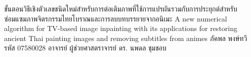 \thispagestyle{empty}
\Rtitle
{ขั้นตอนวิธีเชิงตัวเลขชนิดใหม่สำหรับการต่อเติมภาพที่ใช้การแปรผันรวมกับการประยุกต์สำหรับซ่อมแซมภาพจิตรกรรมไทยโบราณและการลบบทบรรยายจากอนิเมะ}
{A new numerical algorithm for TV-based image inpainting with its applications for restoring ancient Thai painting images and removing subtitles from animes}
{ภัคพล  พงษ์ทวี รหัส 07580028}
{อาจารย์ ผู้ช่วยศาสตราจารย์ ดร. นพดล  ชุมชอบ}



\clearpage
